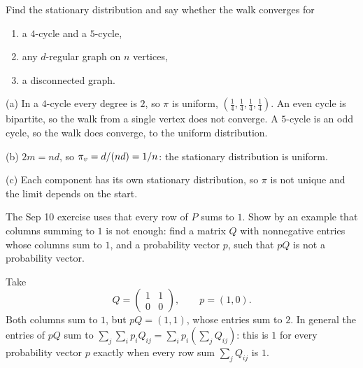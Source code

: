 \begin{exercisebox}
\begin{pproblem}\label{pp:walkshort}
    Find the stationary distribution and say whether the walk converges for
    \begin{enumerate}[label=(\alph*)]
        \item a $4$-cycle and a $5$-cycle,
        \item any $d$-regular graph on $n$ vertices,
        \item a disconnected graph.
    \end{enumerate}
\end{pproblem}
\tcblower
\begin{wsolution}
    (a) In a $4$-cycle every degree is $2$, so $\pi$ is uniform,
    $\left(\frac{1}{4}, \frac{1}{4}, \frac{1}{4}, \frac{1}{4}\right)$. An even cycle is bipartite, so
    the walk from a single vertex does not converge. A $5$-cycle is an odd cycle, so the walk does
    converge, to the uniform distribution.

    (b) $2m = nd$, so $\pi_v = d/(nd) = 1/n$: the stationary distribution is
    uniform.

    (c) Each component has its own stationary distribution, so $\pi$ is not unique and the limit
    depends on the start.
\end{wsolution}
\end{exercisebox}


\begin{exercisebox}
\begin{pproblem}\label{wp:columns}
    The Sep 10 exercise uses that every row of $P$ sums to $1$. Show by an example that columns
    summing to $1$ is not enough: find a matrix $Q$ with nonnegative entries whose columns sum to
    $1$, and a probability vector $p$, such that $pQ$ is not a probability vector.
\end{pproblem}
\tcblower
\begin{wsolution}
    Take
    \[Q = \begin{pmatrix} 1 & 1 \\ 0 & 0 \end{pmatrix}, \qquad p = (1, 0).\]
    Both columns sum to $1$, but $pQ = (1, 1)$, whose entries sum to $2$. In general the entries of
    $pQ$ sum to $\sum_j \sum_i p_i Q_{ij} = \sum_i p_i \left(\sum_j Q_{ij}\right)$: this is $1$ for
    every probability vector $p$ exactly when every row sum $\sum_j Q_{ij}$ is $1$.
\end{wsolution}
\end{exercisebox}
